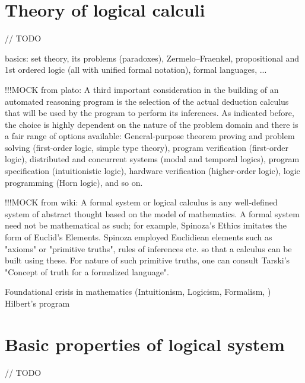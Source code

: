 \documentclass[article]{aaltoseries}
\begin{document}

\section{Theory of logical calculi}
\label{sec:formal_theory}
// TODO

basics: set theory, its problems (paradoxes), Zermelo–Fraenkel, propositional and 1st ordered logic (all with unified formal notation), formal languages, ...


!!!MOCK from plato: %
A third important consideration in the building of an automated reasoning program is the selection of the actual deduction calculus that will be used by the program to perform its inferences. As indicated before, the choice is highly dependent on the nature of the problem domain and there is a fair range of options available: General-purpose theorem proving and problem solving (first-order logic, simple type theory), program verification (first-order logic), distributed and concurrent systems (modal and temporal logics), program specification (intuitionistic logic), hardware verification (higher-order logic), logic programming (Horn logic), and so on.

!!!MOCK from wiki: A formal system or logical calculus is any well-defined system of abstract thought based on the model of mathematics. A formal system need not be mathematical as such; for example, Spinoza's Ethics imitates the form of Euclid's Elements. Spinoza employed Euclidiean elements such as "axioms" or "primitive truths", rules of inferences etc. so that a calculus can be built using these. For nature of such primitive truths, one can consult Tarski's "Concept of truth for a formalized language".

Foundational crisis in mathematics (Intuitionism, Logicism, Formalism, ) Hilbert’s program


\section{Basic properties of logical system}
\label{sec:logic_properties}
// TODO
\end{document}

